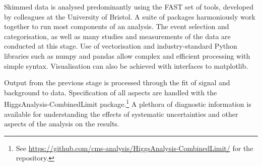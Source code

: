 Skimmed data is analysed predominantly using the FAST set of tools, developed by colleagues at the University of Bristol. A suite of packages harmoniously work together to run most components of an analysis. The event selection and categorisation, as well as many studies and measurements of the data are conducted at this stage. Use of vectorisation and industry-standard Python libraries such as \textsf{numpy} and \textsf{pandas} allow complex and efficient processing with simple syntax. Visualisation can also be achieved with interfaces to \textsf{matplotlib}.

Output from the previous stage is processed through the fit of signal and background to data. Specification of all aspects are handled with the \textsf{HiggsAnalysis-CombinedLimit} package.\footnote{See \url{https://github.com/cms-analysis/HiggsAnalysis-CombinedLimit/} for the repository.} A plethora of diagnostic information is available for understanding the effects of systematic uncertainties and other aspects of the analysis on the results.
